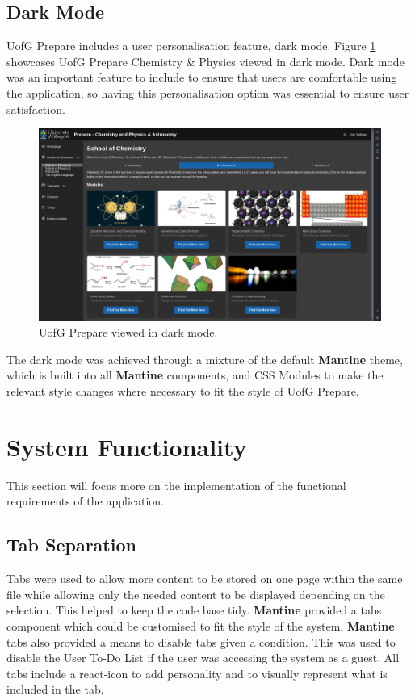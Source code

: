 \documentclass{l4proj}
\begin{document}
\subsection{Dark Mode}
UofG Prepare includes a user personalisation feature,  dark mode. Figure \ref{fig:darkmode} showcases UofG Prepare Chemistry \& Physics viewed in dark mode. Dark mode was an important feature to include to ensure that users are comfortable using the application,  so having this personalisation option was essential to ensure user satisfaction.

\begin{figure}[ht]
    \centering
    \includegraphics[width=0.9\linewidth]{images/darkmode.pdf}    

    \caption{UofG Prepare viewed in dark mode.}

    \label{fig:darkmode} 
\end{figure}

The dark mode was achieved through a mixture of the default \textbf{Mantine} theme,  which is built into all \textbf{Mantine} components,  and CSS Modules to make the relevant style changes where necessary to fit the style of UofG Prepare.

\section{System Functionality}
This section will focus more on the implementation of the functional requirements of the application.

\subsection{Tab Separation} \label{tabs}
Tabs were used to allow more content to be stored on one page within the same file while allowing only the needed content to be displayed depending on the selection. This helped to keep the code base tidy. \textbf{Mantine} provided a tabs component which could be customised to fit the style of the system. \textbf{Mantine} tabs also provided a means to disable tabs given a condition. This was used to disable the User To-Do List if the user was accessing the system as a guest. All tabs include a react-icon to add personality and to visually represent what is included in the tab.
\end{document}
